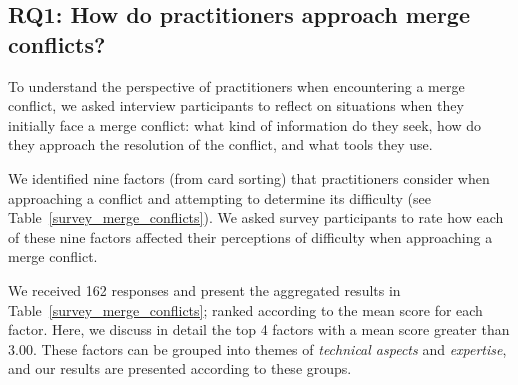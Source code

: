 
\subsection{\textbf{RQ1:} How do practitioners approach merge conflicts?}\label{RQ1}
To understand the perspective of practitioners when encountering a merge conflict, we asked interview participants to reflect on situations when they initially face a merge conflict: what kind of information do they seek, how do they approach the resolution of the conflict, and what tools they use. 

We identified nine factors (from card sorting) that practitioners consider when approaching a conflict and attempting to determine its difficulty (see Table~\ref{survey_merge_conflicts}). 
We asked survey participants to rate how each of these nine factors affected their perceptions of difficulty when approaching a merge conflict.


We received 162 responses and present the aggregated results in Table~\ref{survey_merge_conflicts}; ranked according to the mean score for each factor.
Here, we discuss in detail the top 4 factors with a mean score greater than $3.00$.
These factors can be grouped into themes of \textit{technical aspects} and \textit{expertise}, and our results are presented according to these groups.

